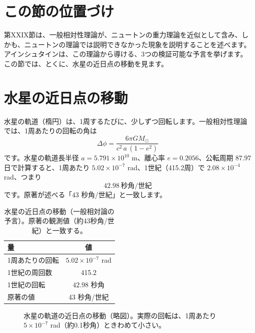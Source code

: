 \documentclass[a4paper,11pt,openany]{ltjsbook}
\begin{document}
\section{この節の位置づけ}

第XXIX節は、一般相対性理論が、ニュートンの重力理論を近似として含み、しかも、ニュートンの理論では説明できなかった現象を説明することを述べます。アインシュタインは、この理論から導ける、3つの検証可能な予言を挙げます。この節では、とくに、水星の近日点の移動を見ます。

\section{水星の近日点の移動}

水星の軌道（楕円）は、1周するたびに、少しずつ回転します。一般相対性理論では、1周あたりの回転の角は
\[
\Delta\phi=\frac{6\pi GM_\odot}{c^2\,a\,(1-e^2)}
\]
です。水星の軌道長半径 $a=5.791\times10^{10}$ m、離心率 $e=0.2056$、公転周期 $87.97$ 日で計算すると、1周あたり $5.02\times10^{-7}$ rad、1世紀（415.2周）で $2.08\times10^{-4}$ rad、つまり
\[
42.98\ \text{秒角}/\text{世紀}
\]
です。原著が述べる「$43$ 秒角/世紀」と一致します。

\begin{table}[htbp]
\centering
\begin{tabular}{lc}
\toprule
量 & 値\\
\midrule
1周あたりの回転 & $5.02\times10^{-7}$ rad\\
1世紀の周回数 & 415.2\\
1世紀の回転 & $42.98$ 秒角\\
原著の値 & 43 秒角/世紀\\
\bottomrule
\end{tabular}
\caption{水星の近日点の移動（一般相対論の予言）。原著の観測値（約43秒角/世紀）と一致する。}
\end{table}

\begin{figure}[htbp]
\centering
{}
\caption{水星の軌道の近日点の移動（略図）。実際の回転は、1周あたり $5\times10^{-7}$ rad（約0.1秒角）ときわめて小さい。}
\end{figure}
\end{document}
